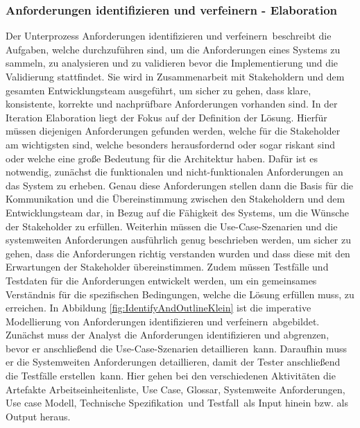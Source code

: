 \subsubsection{Anforderungen identifizieren und verfeinern - Elaboration}
 Der Unterprozess \grqq Anforderungen identifizieren und verfeinern\grqq \ beschreibt die Aufgaben, welche durchzuführen sind, um die Anforderungen eines Systems zu sammeln, zu analysieren und zu validieren bevor die Implementierung und die Validierung stattfindet. Sie wird in Zusammenarbeit mit Stakeholdern und dem gesamten Entwicklungsteam ausgeführt, um sicher zu gehen, dass klare, konsistente, korrekte und nachprüfbare Anforderungen vorhanden sind.\newline
 In der Iteration Elaboration liegt der Fokus auf der Definition der Lösung. Hierfür müssen diejenigen Anforderungen gefunden werden, welche für die Stakeholder am wichtigsten sind, welche besonders herausfordernd oder sogar riskant sind oder welche eine große Bedeutung für die Architektur haben.\newline
 Dafür ist es notwendig, zunächst die funktionalen und nicht-funktionalen Anforderungen an das System zu erheben. Genau diese Anforderungen stellen dann die Basis für die Kommunikation und die Übereinstimmung zwischen den Stakeholdern und dem Entwicklungsteam dar, in Bezug auf die Fähigkeit des Systems, um die Wünsche der Stakeholder zu erfüllen.\newline
 Weiterhin müssen die Use-Case-Szenarien und die systemweiten Anforderungen ausführlich genug beschrieben werden, um sicher zu gehen, dass die Anforderungen richtig verstanden wurden und dass diese mit den Erwartungen der Stakeholder übereinstimmen.\newline
 Zudem müssen Testfälle und Testdaten für die Anforderungen entwickelt werden, um ein gemeinsames Verständnis für die spezifischen Bedingungen, welche die Lösung erfüllen muss, zu erreichen.
 In Abbildung \ref{fig:IdentifyAndOutlineKlein} ist die imperative Modellierung von \grqq Anforderungen identifizieren und verfeinern\grqq \ abgebildet. \newline
 Zunächst muss der Analyst die \grqq Anforderungen identifizieren und abgrenzen\grqq, bevor er anschließend die \grqq Use-Case-Szenarien detaillieren\grqq \ kann. Daraufhin muss er die \grqq Systemweiten Anforderungen detaillieren\grqq, damit der Tester anschließend die \grqq Testfälle erstellen\grqq \ kann.\newline
 Hier gehen bei den verschiedenen Aktivitäten die Artefakte \grqq Arbeitseinheitenliste\grqq, \grqq Use Case\grqq, \grqq Glossar\grqq, \grqq Systemweite Anforderungen\grqq, \grqq Use case Modell\grqq, \grqq Technische Spezifikation\grqq \ und \grqq Testfall\grqq \ als Input hinein bzw. als Output heraus.
 
